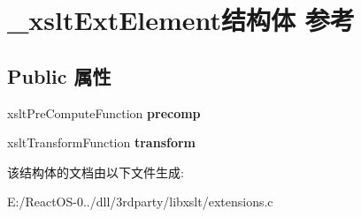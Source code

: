 \hypertarget{struct__xslt_ext_element}{}\section{\+\_\+xslt\+Ext\+Element结构体 参考}
\label{struct__xslt_ext_element}
\subsection*{Public 属性}
\begin{DoxyCompactItemize}
\item 
\mbox{\label{struct__xslt_ext_element_a6036acd5df922f2664eac2177de17d86}} 
xslt\+Pre\+Compute\+Function {\bfseries precomp}
\item 
\mbox{\label{struct__xslt_ext_element_a995a831fa5409c6c54d06d8e88276bbc}} 
xslt\+Transform\+Function {\bfseries transform}
\end{DoxyCompactItemize}


该结构体的文档由以下文件生成\+:\begin{DoxyCompactItemize}
\item 
E\+:/\+React\+O\+S-\/0../dll/3rdparty/libxslt/extensions.\+c\end{DoxyCompactItemize}
